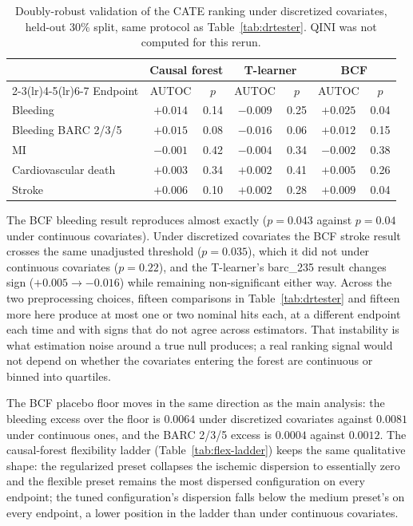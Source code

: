 \begin{table}[H]
\centering
\caption{Doubly-robust validation of the CATE ranking under discretized covariates, held-out
30\% split, same protocol as Table~\ref{tab:drtester}. QINI was not computed for this rerun.}
\label{tab:discretized-drtester}
\small
\setlength{\tabcolsep}{4pt}
\begin{tabular}{lcccccc}
\toprule
& \multicolumn{2}{c}{Causal forest} & \multicolumn{2}{c}{T-learner} & \multicolumn{2}{c}{BCF} \\
\cmidrule(lr){2-3}\cmidrule(lr){4-5}\cmidrule(lr){6-7}
Endpoint & AUTOC & $p$ & AUTOC & $p$ & AUTOC & $p$ \\
\midrule
Bleeding             & $+0.014$ & 0.14 & $-0.009$ & 0.25 & $+0.025$ & 0.04 \\
Bleeding BARC 2/3/5  & $+0.015$ & 0.08 & $-0.016$ & 0.06 & $+0.012$ & 0.15 \\
MI                   & $-0.001$ & 0.42 & $-0.004$ & 0.34 & $-0.002$ & 0.38 \\
Cardiovascular death & $+0.003$ & 0.34 & $+0.002$ & 0.41 & $+0.005$ & 0.26 \\
Stroke               & $+0.006$ & 0.10 & $+0.002$ & 0.28 & $+0.009$ & 0.04 \\
\bottomrule
\end{tabular}
\end{table}

The BCF bleeding result reproduces almost exactly ($p=0.043$ against $p=0.04$ under
continuous covariates). Under discretized covariates the BCF stroke result crosses the same
unadjusted threshold ($p=0.035$), which it did not under continuous covariates ($p=0.22$),
and the T-learner's barc\_235 result changes sign ($+0.005\to-0.016$) while remaining
non-significant either way. Across the two preprocessing choices, fifteen comparisons in
Table~\ref{tab:drtester} and fifteen more here produce at most one or two nominal hits each,
at a different endpoint each time and with signs that do not agree across estimators. That
instability is what estimation noise around a true null produces; a real ranking signal would
not depend on whether the covariates entering the forest are continuous or binned into
quartiles.

The BCF placebo floor moves in the same direction as the main analysis: the bleeding excess
over the floor is $0.0064$ under discretized covariates against $0.0081$ under continuous
ones, and the BARC 2/3/5 excess is $0.0004$ against $0.0012$. The causal-forest flexibility
ladder (Table~\ref{tab:flex-ladder}) keeps the same qualitative shape: the regularized preset
collapses the ischemic dispersion to essentially zero and the flexible preset remains the most
dispersed configuration on every endpoint; the tuned configuration's dispersion falls below
the medium preset's on every endpoint, a lower position in the ladder than under continuous
covariates.

